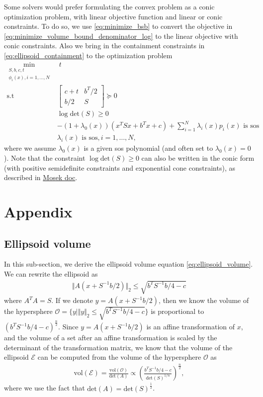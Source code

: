 \documentclass{article}
\begin{document}
Some solvers would prefer formulating the convex problem as a conic optimization problem, with linear objective function and linear or conic constraints. To do so, we use \eqref{eq:minimize_bsb} to convert the objective in \eqref{eq:minimize_volume_bound_denominator_log} to the linear objective with conic constraints. Also we bring in the containment constraints in \eqref{eq:ellipsoid_containment} to the optimization problem
\begin{subequations}
\begin{align}
	\min_{\substack{S, b, c, t\\ \phi_i(x), i=1,\hdots,N}}& \; t\\
	\text{s.t }& \begin{bmatrix} c + t & b^T/2 \\ b/2 & S\end{bmatrix} \succeq 0\\
		&\log\text{det}(S) \ge 0\\
	&-(1+\lambda_0(x))(x^TSx + b^Tx + c) + \sum_{i=1}^N \lambda_i(x) p_i(x) \text{ is sos}\\
	&\lambda_i(x) \text{ is sos}, i=1,\hdots, N,
\end{align}
\end{subequations}
where we assume $\lambda_0(x)$ is a given sos polynomial (and often set to $\lambda_0(x) = 0$). Note that the constraint $\log\text{det}(S) \ge 0$ can also be written in the conic form (with positive semidefinite constraints and exponential cone constraints), as described in \href{https://docs.mosek.com/modeling-cookbook/sdo.html#log-determinant}{Mosek doc}.

\section{Appendix}
\subsection{Ellipsoid volume}
In this sub-section, we derive the ellipsoid volume equation \eqref{eq:ellipsoid_volume}. We can rewrite the ellipsoid as
\begin{align}
	\Vert A(x+S^{-1}b/2)\Vert_2 \le \sqrt{b^TS^{-1}b/4-c}
\end{align}
where $A^TA = S$. If we denote $y = A(x + S^{-1}b/2)$, then we know the volume of the hypersphere $\mathcal{O} = \{y | \Vert y\Vert_2\le \sqrt{b^TS^{-1}b/4-c}\}$ is proportional to $(b^TS^{-1}b/4-c)^{\frac{n}{2}}$. Since $y=A(x+S^{-1}b/2)$ is an affine transformation of $x$, and the volume of a set after an affine transformation is scaled by the determinant of the transformation matrix, we know that the volume of the ellipsoid $\mathcal{E}$ can be computed from the volume of the hypersphere $\mathcal{O}$ as
\begin{align}
	\text{vol}(\mathcal{E}) = \frac{\text{vol}(\mathcal{O})}{\text{det}(A)} \propto \left(\frac{b^TS^{-1}b/4-c}{\text{det}(S)^{1/n}}\right)^{\frac{n}{2}},
\end{align}
where we use the fact that $\text{det}(A) = \text{det}(S)^{\frac{1}{2}}$.
\end{document}
